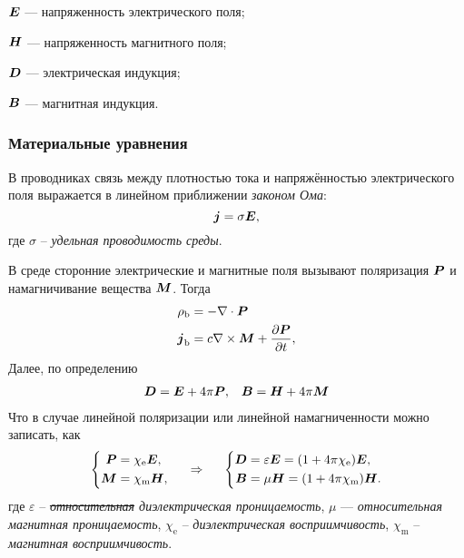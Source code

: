 \begin{description*}
    \item[$\mbox{\boldmath $E$}$]  --- напряженность электрического поля;
    \item[$\mbox{\boldmath $H$}$]  --- напряженность магнитного поля;
    \item[$\mbox{\boldmath $D$}$]  --- электрическая индукция;
    \item[$\mbox{\boldmath $B$}$]  --- магнитная индукция.
\end{description*}

\subsubsection*{Материальные уравнения}

В проводниках связь между плотностью тока и напряжённостью электрического поля выражается в линейном приближении \textit{законом Ома}:
\begin{equation*}
    \mbox{\boldmath $j$} = \sigma \mbox{\boldmath $E$},
\end{equation*}
где $\sigma$ -- \textit{удельная проводимость среды}.

В среде сторонние электрические и магнитные поля вызывают поляризация $\mbox{\boldmath $P$}$ и намагничивание вещества $\mbox{\boldmath $M$}$.
Тогда
\begin{align*}
    \rho_\text{b} &= - \nabla \cdot \mbox{\boldmath $P$} \\
    \mbox{\boldmath $j$}_\text{b} &= c \nabla \times \mbox{\boldmath $M$} + \frac{\partial \mbox{\boldmath $P$}}{\partial t} ,
\end{align*}
Далее, по определению
\begin{align*}
    \mbox{\boldmath $D$} &= \mbox{\boldmath $E$} + 4\pi \mbox{\boldmath $P$}, &\mbox{\boldmath $B$} &= \mbox{\boldmath $H$} + 4 \pi \mbox{\boldmath $M$} \\
\end{align*}
Что в случае линейной поляризации или линейной намагниченности можно записать, как  
$$
    \left\{\begin{aligned}
        \mbox{\boldmath $P$} &= \chi_{\text{e}} \mbox{\boldmath $E$}, \\
        \mbox{\boldmath $M$} &= \chi_{\text{m}} \mbox{\boldmath $H$}, \\
    \end{aligned}\right.
    \hspace{0.5cm} \Rightarrow \hspace{0.5cm} 
    \left\{\begin{aligned}
         \mbox{\boldmath $D$} &= \varepsilon \mbox{\boldmath $E$} = (1 + 4\pi \chi_{\text{e}}) \mbox{\boldmath $E$}, \\
       \mbox{\boldmath $B$} &= \mu \mbox{\boldmath $H$} = (1 + 4 \pi \chi_{\text{m}}) \mbox{\boldmath $H$}.
    \end{aligned}\right.
$$
где $\varepsilon$ -- \textit{\sout{относительная} диэлектрическая проницаемость}, $\mu$  — \textit{относительная магнитная проницаемость}, $\chi_{\text{e}}$  -- \textit{диэлектрическая восприимчивость}, $\chi_{\text{m}}$ -- \textit{магнитная восприимчивость}.

